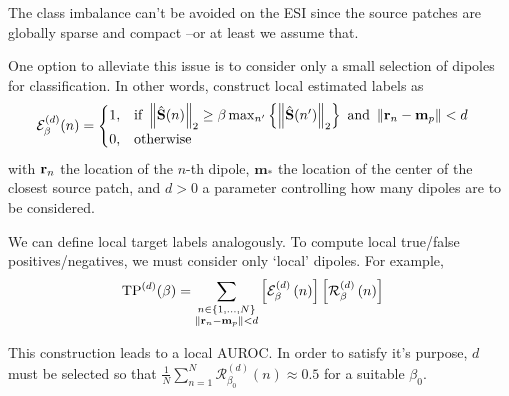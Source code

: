 The class imbalance can't be avoided on the ESI since the source patches are globally sparse and compact --or at least we assume that.

One option to alleviate this issue is to consider only a small selection of dipoles for classification.
%
In other words, construct local estimated labels as
\begin{align}
\mathcal{E}_\beta^{(d)}(n)
&=
\begin{cases}
1, &\text{if }
\left\lVert \hat{\mathbf{S}}(n) \right\rVert_2 \geq \beta \max_{n'}\left\{ \left\lVert \hat{\mathbf{S}}(n') \right\rVert_2 \right\}
\text{ and }
\left\lVert \mathbf{r}_n-\mathbf{m}_p \right\rVert<d
\\
0, &\text{otherwise}
\end{cases}
\end{align}
with $\mathbf{r}_n$ the location of the $n$-th dipole, $\mathbf{m}_*$ the location of the center of the closest source patch, and $d>0$ a parameter controlling how many dipoles are to be considered.

We can define local target labels analogously.
%
To compute local true/false positives/negatives, we must consider only `local' dipoles.
%
For example, 
\begin{align}
    \text{TP}^{(d)}(\beta)
&=
\sum_{\substack{n\in \left\{ 1, \dots, N \right\} \\ \left\lVert \mathbf{r}_n-\mathbf{m}_p \right\rVert<d}}
\left[ \mathcal{E}^{(d)}_\beta\left( n \right) \right]
\left[ \mathcal{R}^{(d)}_\beta\left( n \right) \right]
\end{align}

This construction leads to a local AUROC.
%
In order to satisfy it's purpose, $d$ must be selected so that
$\frac{1}{N} \sum_{n=1}^N \mathcal{R}^{(d)}_{\beta_0} (n) \approx 0.5$ for a suitable $\beta_0$.

%
%
%

